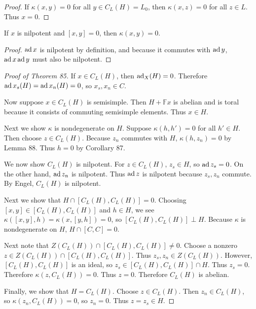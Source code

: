 \documentclass[twoside, 10pt]{article}
\newcommand{\F}{\mathbb{F}}
\begin{document}
    \begin{proof}
        If $\kappa(x,y) = 0$ for all $y \in C_L(H) = L_0$, then $\kappa(x,z) = 0$ for all $z \in L$. Thus $x = 0$.
    \end{proof}

    \begin{lem}
        If $x$ is nilpotent and $[x,y] = 0$, then $\kappa(x,y) = 0$.
    \end{lem}

    \begin{proof}
        $\operatorname{ad} x$ is nilpotent by definition, and because it commutes with $\operatorname{ad} y$, $\operatorname{ad} x \operatorname{ad} y$ must also be nilpotent.
    \end{proof}

    \begin{proof}[Proof of Theorem 85]
        If $x \in C_L(H)$, then $\operatorname{ad}_X(H) = 0$. Therefore $\operatorname{ad} x_s(H) = \operatorname{ad} x_n(H) = 0$, so $x_s, x_n \in C$.

        Now suppose $x \in C_L(H)$ is semisimple. Then $H + \F x$ is abelian and is toral because it consists of commuting semisimple elements. Thus $x \in H$.

        Next we show $\kappa$ is nondegenerate on $H$. Suppose $\kappa(h,h') = 0$ for all $h' \in H$. Then choose $z \in C_L(H)$. Because $z_n$ commutes with $H$, $\kappa(h,z_n) = 0$ by Lemma 88. Thus $h = 0$ by Corollary 87.

        We now show $C_L(H)$ is nilpotent. For $z \in C_L(H)$, $z_s \in H$, so $\operatorname{ad} z_s = 0$. On the other hand, $\operatorname{ad} z_n$ is nilpotent. Thus $\operatorname{ad} z$ is nilpotent because $z_s, z_n$ commute. By Engel, $C_L(H)$ is nilpotent.

        Next we show that $H \cap [C_L(H),C_L(H)] = 0$. Choosing $[x,y] \in [C_L(H),C_L(H)]$ and $h \in H$, we see $\kappa([x,y],h) = \kappa(x,[y,h]) = 0$, so $[C_L(H),C_L(H)] \perp H$. Because $\kappa$ is nondegenerate on $H$, $H \cap [C,C] = 0$.

        Next note that $Z(C_L(H)) \cap [C_L(H),C_L(H)] \neq 0$. Choose a nonzero $z \in Z(C_L(H)) \cap [C_L(H), C_L(H)]$. Thus $z_s,z_n \in Z(C_L(H))$. However, $[C_L(H), C_L(H)]$ is an ideal, so $z_s \in [C_L(H), C_L(H)] \cap H$. Thus $z_s = 0$. Therefore $\kappa(z,C_L(H)) = 0$. Thus $z = 0$. Therefore $C_L(H)$ is abelian.

        Finally, we show that $H = C_L(H)$. Choose $z \in C_L(H)$. Then $z_n \in C_L(H)$, so $\kappa(z_n,C_L(H)) = 0$, so $z_n = 0$. Thus $z = z_s \in H$.
    \end{proof}
\end{document}
